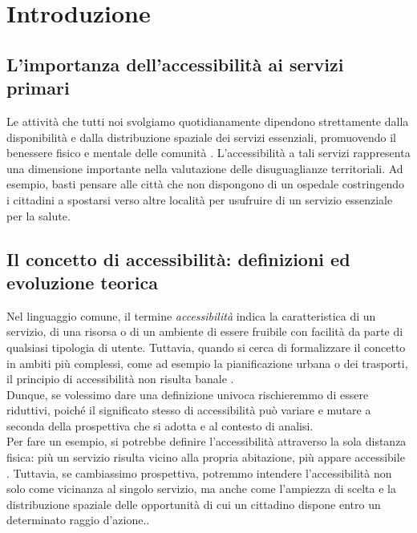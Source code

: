 \chapter{Introduzione}

\section{L'importanza dell'accessibilità ai servizi primari}

Le attività che tutti noi svolgiamo quotidianamente dipendono strettamente dalla disponibilità e dalla distribuzione spaziale dei servizi essenziali, promuovendo il benessere fisico e mentale delle comunità \cite{wu2025}. 
L'accessibilità a tali servizi rappresenta una dimensione importante nella valutazione delle disuguaglianze territoriali. Ad esempio, basti pensare alle città che non dispongono di un ospedale costringendo i cittadini a spostarsi verso altre località per usufruire di un servizio essenziale per la salute. 


\section{Il concetto di accessibilità: definizioni ed evoluzione teorica}

Nel linguaggio comune, il termine \emph{accessibilità} indica la caratteristica di un servizio, di una risorsa o di un ambiente di essere fruibile con facilità da parte di qualsiasi tipologia di utente. Tuttavia, quando si cerca di formalizzare il concetto in ambiti più complessi, come ad esempio la pianificazione urbana o dei trasporti, il principio di accessibilità non risulta banale \cite{geurs2004}.\\
Dunque, se volessimo dare una definizione univoca rischieremmo di essere riduttivi, poiché il significato stesso di accessibilità può variare e mutare a seconda della prospettiva che si adotta e al contesto di analisi. \\
Per fare un esempio, si potrebbe definire l'accessibilità attraverso la sola distanza fisica: più un servizio risulta vicino alla propria abitazione, più appare accessibile \cite{benassai2026}.
Tuttavia, se cambiassimo prospettiva, potremmo intendere l'accessibilità non solo come vicinanza al singolo servizio, ma anche come l'ampiezza di scelta e la distribuzione spaziale delle opportunità di cui un cittadino dispone entro un determinato raggio d'azione.\cite{geurs2004}. \\

